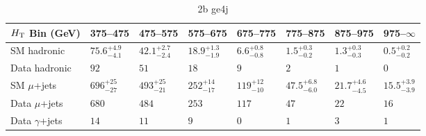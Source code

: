 \documentclass[8pt]{article}
\def\scalht{\mbox{$H_{\rm{T}}$}\xspace}
\newcommand\T{\rule{0pt}{2.6ex}}
\newcommand\B{\rule[-1.2ex]{0pt}{0pt}}
\begin{document}
\begin{table}[ht!]
\caption{2b ge4j}
\label{tab:ensemble-2b ge4j}
\centering
\begin{tabular}{ llllllll }

\hline
\scalht Bin (GeV)       & 375--475                       & 475--575                       & 575--675                       & 675--775                       & 775--875                       & 875--975                       & 975--$\infty$                  \\ [1.000000ex]
\hline
SM hadronic\T           & $75.6^{+4.9}_{-4.1}$           & $42.1^{+2.7}_{-2.4}$           & $18.9^{+1.3}_{-1.9}$           & $6.6^{+0.8}_{-0.8}$            & $1.5^{+0.3}_{-0.2}$            & $1.3^{+0.3}_{-0.3}$            & $0.5^{+0.2}_{-0.2}$            \\ 
Data hadronic\B         & $92$                           & $51$                           & $18$                           & $9$                            & $2$                            & $1$                            & $0$                            \\ 
\hline
SM $\mu$+jets\T         & $696^{+25}_{-27}$              & $493^{+25}_{-21}$              & $252^{+14}_{-17}$              & $119^{+12}_{-10}$              & $47.5^{+6.8}_{-6.0}$           & $21.7^{+4.6}_{-4.5}$           & $15.5^{+3.9}_{-3.9}$           \\ 
Data $\mu$+jets\B       & $680$                          & $484$                          & $253$                          & $117$                          & $47$                           & $22$                           & $16$                           \\ 
\hline
Data $\gamma$+jets\B    & $14$                           & $11$                           & $9$                            & $0$                            & $1$                            & $3$                            & $1$                            \\ 
\hline

\end{tabular}
\end{table}
\end{document}
